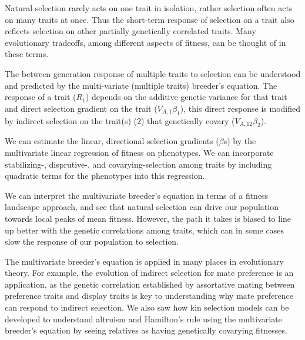 
\begin{ChapterSummary}
\item Natural selection rarely acts on one trait in isolation, rather
selection often acts on many traits at once. Thus
the short-term response of selection on a trait also reflects
selection on other partially genetically correlated traits. Many evolutionary
tradeoffs, among different aspects of fitness, can be thought of in
these terms.
\item The between generation response of multiple traits to selection can be understood and predicted by the multi-variate (multiple traits) breeder's equation. The response of a trait ($R_1$) depends on
  the additive genetic variance for that trait and direct selection
  gradient on the trait ($V_{A,1} \beta_1$), this direct response is
  modified by indirect selection on the trait(s) ($2$) that genetically
  covary ($V_{A,12} \beta_2$).
\item We can estimate the linear, directional selection gradients
  ($\beta$s) by the multivariate linear regression of fitness on phenotypes. We can incorporate stabilizing-, disprutive-, and covarying-selection among traits by including quadratic terms for the phenotypes into this regression.
 \item We can interpret the multivariate breeder's equation in terms of a fitness landscape approach, and see that natural selection can drive our population towards local peaks of mean fitness. However,  the path it takes is biased to line up better with the genetic correlations among traits, which can in some cases slow the response of our population to selection.
 \item The multivariate breeder's equation is applied in many places in evolutionary theory. For example, the evolution of indirect selection for mate preference is an application, as the genetic correlation established by assortative mating between preference traits and display traits is key to understanding why mate preference can respond to indirect selection. We also saw how kin selection models can be developed to understand altruism and Hamilton’s rule using the multivariate breeder's equation by seeing relatives as having genetically covarying fitnesses.
   
 \end{ChapterSummary}

